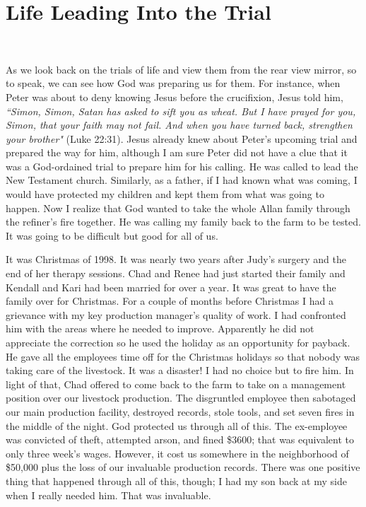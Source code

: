\documentclass[oneside]{book}
\begin{document}
\section{Life Leading Into the Trial}
\

As we look back on the trials of life and view them from the rear view mirror, so to speak, we can see how God was preparing us for them. For instance, when Peter was about to deny knowing Jesus before the crucifixion, Jesus told him, \textit{``Simon, Simon, Satan has asked to sift you as wheat. But I have prayed for you, Simon, that your faith may not fail. And when you have turned back, strengthen your brother"} (Luke 22:31). Jesus already knew about Peter's upcoming trial and  prepared the way for him, although I am sure Peter did not have a clue that it was a God-ordained trial to prepare him for his calling. He was called to lead the New Testament church. Similarly, as a father, if I had known what was coming, I would have protected my children and kept them from what was going to happen. Now I realize that God wanted to take the whole Allan family through the refiner's fire together. He was calling my family back to the farm to be tested. It was going to be difficult but good for all of us. 

It was Christmas of 1998. It was nearly two years after Judy's surgery and the end of her therapy sessions. Chad and Renee had just started their family and Kendall and Kari had been married for over a year. It was great to have the family over for Christmas. For a couple of months before Christmas I had a grievance with my key production manager's quality of work. I had confronted him with the areas where he needed to improve. Apparently he did not appreciate the correction so he used the holiday as an opportunity for payback. He gave all the employees time off for the Christmas holidays so that nobody was taking care of the livestock. It was a disaster! I had no choice but to fire him. In light of that, Chad offered to come back to the farm to take on a management position over our livestock production. The disgruntled employee then sabotaged our main production facility, destroyed records, stole tools, and set seven fires in the middle of the night. God protected us through all of this. The ex-employee was convicted of theft, attempted arson, and fined \$3600; that was equivalent to only three week's wages. However, it cost us somewhere in the neighborhood of \$50,000 plus the loss of our invaluable production records. There was one positive thing that happened through all of this, though; I had my son back at my side when I really needed him. That was invaluable.
\end{document}
